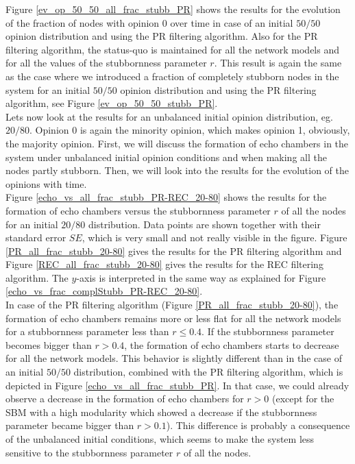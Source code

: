 \documentclass[11 pt , letterpaper , twoside , openright]{book}
\begin{document}
\noindent
Figure \ref{ev_op_50_50_all_frac_stubb_PR} shows the results for the evolution of the fraction of nodes with opinion 0 over time in case of an initial $50/50$ opinion distribution and using the PR filtering algorithm. Also for the PR filtering algorithm, the status-quo is maintained for all the network models and for all the values of the stubbornness parameter $r$. This result is again the same as the case where we introduced a fraction of completely stubborn nodes in the system for an initial $50/50$ opinion distribution and using the PR filtering algorithm, see Figure \ref{ev_op_50_50_stubb_PR}.\\
\newline
Lets now look at the results for an unbalanced initial opinion distribution, eg. $20/80$. Opinion 0 is again the minority opinion, which makes opinion 1, obviously, the majority opinion. First, we will discuss the formation of echo chambers in the system under unbalanced initial opinion conditions and when making all the nodes partly stubborn. Then, we will look into the results for the evolution of the opinions with time.\\
\newline
Figure \ref{echo_vs_all_frac_stubb_PR-REC_20-80} shows the results for the formation of echo chambers versus the stubbornness parameter $r$ of all the nodes for an initial $20/80$ distribution. Data points are shown together with their standard error $SE$, which is very small and not really visible in the figure. Figure \ref{PR_all_frac_stubb_20-80} gives the results for the PR filtering algorithm and Figure \ref{REC_all_frac_stubb_20-80} gives the results for the REC filtering algorithm. The $y$-axis is interpreted in the same way as explained for Figure \ref{echo_vs_frac_complStubb_PR-REC_20-80}.\\
\newline
In case of the PR filtering algorithm (Figure \ref{PR_all_frac_stubb_20-80}), the formation of echo chambers remains more or less flat for all the network models for a stubbornness parameter less than $r \leqslant 0.4$. If the stubbornness parameter becomes bigger than $r > 0.4$, the formation of echo chambers starts to decrease for all the network models. This behavior is slightly different than in the case of an initial $50/50$ distribution, combined with the PR filtering algorithm, which is depicted in Figure \ref{echo_vs_all_frac_stubb_PR}. In that case, we could already observe a decrease in the formation of echo chambers for $r > 0$ (except for the SBM with a high modularity which showed a decrease if the stubbornness parameter became bigger than $r>0.1$). This difference is probably a consequence of the unbalanced initial conditions, which seems to make the system less sensitive to the stubbornness parameter $r$ of all the nodes.\\
\end{document}
